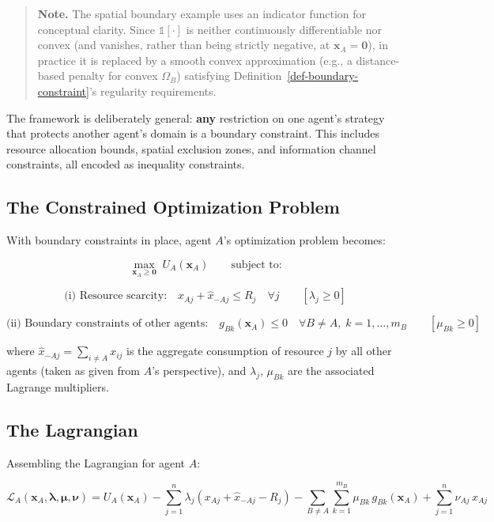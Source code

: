 \documentclass[11pt]{article}
\theoremstyle{plain}
\theoremstyle{definition}
\theoremstyle{remark}
\let\origsubsection\subsection
\renewcommand{\subsection}{\needspace{7\baselineskip}\origsubsection}
\begin{document}
\begin{quote}
\textbf{Note.} The spatial boundary example uses an indicator function
for conceptual clarity. Since \(\mathds{1}[\cdot]\) is neither
continuously differentiable nor convex (and vanishes, rather than being
strictly negative, at \(\mathbf{x}_A = \mathbf{0}\)), in practice it is
replaced by a smooth convex approximation (e.g., a distance-based
penalty for convex \(\Omega_B\)) satisfying
Definition~\ref{def-boundary-constraint}'s regularity requirements.
\end{quote}

The framework is deliberately general: \textbf{any} restriction on one
agent's strategy that protects another agent's domain is a boundary
constraint. This includes resource allocation bounds, spatial exclusion
zones, and information channel constraints, all encoded as inequality
constraints.

\subsection{The Constrained Optimization
Problem}\label{the-constrained-optimization-problem}

With boundary constraints in place, agent \(A\)'s optimization problem
becomes:

\[\max_{\mathbf{x}_A \geq \mathbf{0}} \; U_A(\mathbf{x}_A) \qquad \text{subject to:}\]

\[\text{(i) Resource scarcity:} \quad x_{Aj} + \hat{x}_{-Aj} \leq R_j \quad \forall j \qquad [\lambda_j \geq 0]\]

\[\text{(ii) Boundary constraints of other agents:} \quad g_{Bk}(\mathbf{x}_A) \leq 0 \quad \forall B \neq A, \; k = 1, \ldots, m_B \qquad [\mu_{Bk} \geq 0]\]

where \(\hat{x}_{-Aj} = \sum_{i \neq A} x_{ij}\) is the aggregate
consumption of resource \(j\) by all other agents (taken as given from
\(A\)'s perspective), and \(\lambda_j\), \(\mu_{Bk}\) are the associated
Lagrange multipliers.

\subsection{The Lagrangian}\label{the-lagrangian}

Assembling the Lagrangian for agent \(A\):

\[\mathcal{L}_A(\mathbf{x}_A, \boldsymbol{\lambda}, \boldsymbol{\mu}, \boldsymbol{\nu}) = U_A(\mathbf{x}_A) - \sum_{j=1}^{n} \lambda_j \left( x_{Aj} + \hat{x}_{-Aj} - R_j \right) - \sum_{B \neq A} \sum_{k=1}^{m_B} \mu_{Bk} \, g_{Bk}(\mathbf{x}_A) + \sum_{j=1}^{n} \nu_{Aj} \, x_{Aj}\]
\end{document}
